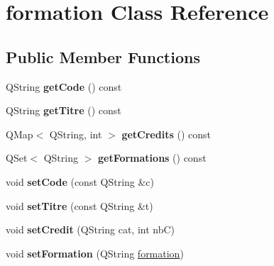 \hypertarget{classformation}{\section{formation Class Reference}
\label{classformation}
}
\subsection*{Public Member Functions}
\begin{DoxyCompactItemize}
\item 
\hypertarget{classformation_a49f0c32e0bc38601c725bcdd0a7252e1}{Q\+String {\bfseries get\+Code} () const }\label{classformation_a49f0c32e0bc38601c725bcdd0a7252e1}

\item 
\hypertarget{classformation_aa151fd31c40af7b9d97d4d49f631a127}{Q\+String {\bfseries get\+Titre} () const }\label{classformation_aa151fd31c40af7b9d97d4d49f631a127}

\item 
\hypertarget{classformation_a3b11f669e83ad0d5b72838645b1608aa}{Q\+Map$<$ Q\+String, int $>$ {\bfseries get\+Credits} () const }\label{classformation_a3b11f669e83ad0d5b72838645b1608aa}

\item 
\hypertarget{classformation_a0a803b64845bc0b1a2858e794ce53d6d}{Q\+Set$<$ Q\+String $>$ {\bfseries get\+Formations} () const }\label{classformation_a0a803b64845bc0b1a2858e794ce53d6d}

\item 
\hypertarget{classformation_ae1ebb6483415cbdd45d0b08b64fbc965}{void {\bfseries set\+Code} (const Q\+String \&c)}\label{classformation_ae1ebb6483415cbdd45d0b08b64fbc965}

\item 
\hypertarget{classformation_afe8a4194dcf2fb84034103a352261b88}{void {\bfseries set\+Titre} (const Q\+String \&t)}\label{classformation_afe8a4194dcf2fb84034103a352261b88}

\item 
\hypertarget{classformation_ae602dff10220ef6dc3a8ccb000d40b07}{void {\bfseries set\+Credit} (Q\+String cat, int nb\+C)}\label{classformation_ae602dff10220ef6dc3a8ccb000d40b07}

\item 
\hypertarget{classformation_ac080e767e63497ba274149876e34af57}{void {\bfseries set\+Formation} (Q\+String \hyperlink{classformation}{formation})}\label{classformation_ac080e767e63497ba274149876e34af57}

\end{DoxyCompactItemize}
